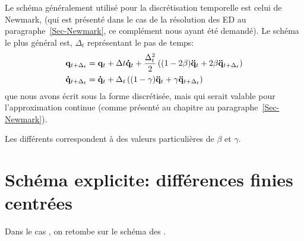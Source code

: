 \medskip
Le schéma généralement utilisé pour la discrétisation temporelle est celui de Newmark,
(qui est présenté dans le cas de la résolution des ED au paragraphe~\ref{Sec-Newmark},
ce complément nous ayant été demandé).
Le schéma le plus général est, $\Delta_t$ représentant le pas de temps:
\begin{equation}\colorblue
\begin{aligned}
&\VV{q}_{t+\Delta_t} = \VV{q}_t + \Delta t \VV{\dot q}_t + \frac{\Delta_t^2}2\left((1-2\beta)\VV{\ddot q}_t
+2\beta\VV{\ddot q}_{t+\Delta_t}\right) \\
&\VV{\dot q}_{t+\Delta_t} = \VV{\dot q}_t+\Delta_t\left((1-\gamma)\VV{\ddot q}_t+\gamma\VV{\ddot q}_{t+\Delta_t}
\right)
\end{aligned}
\end{equation}
que nous avons écrit sous la forme discrétisée, mais qui serait valable pour l'approximation
continue (comme présenté au chapitre au paragraphe~\ref{Sec-Newmark}).

Les différents 
correspondent à des valeurs particulières de $\beta$ et $\gamma$.



\bigskip
\section{Schéma explicite: différences finies centrées}

Dans le cas , on retombe sur le schéma des .

